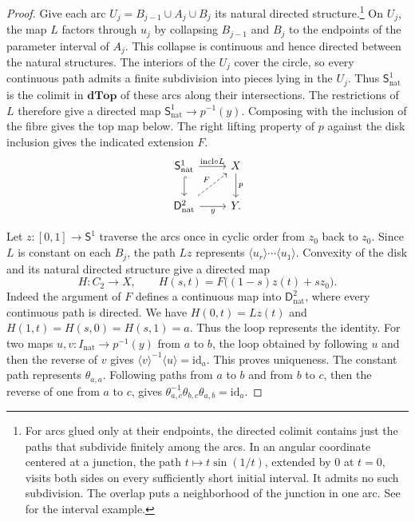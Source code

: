 \documentclass[12pt,a4paper]{amsart}
\theoremstyle{definition}
\newcommand{\D}{\mathbf{dTop}}
\newcommand{\rev}[1]{#1_{\mathrm{nat}}}
\newcommand{\Iv}{\rev{I}}
\newcommand{\cube}[1]{C_{#1}}
\newcommand{\clp}[1]{\langle #1\rangle}
\begin{document}
\begin{proof}
Give each arc $U_j=B_{j-1}\cup A_j\cup B_j$ its natural directed structure.\footnote{For arcs glued only at their endpoints, the directed colimit contains just the paths that subdivide finitely among the arcs. In an angular coordinate centered at a junction, the path $t\mapsto t\sin(1/t)$, extended by $0$ at $t=0$, visits both sides on every sufficiently short initial interval. It admits no such subdivision. The overlap puts a neighborhood of the junction in one arc. See~\cite[Section~1.5, pp.~289--290]{mg} for the interval example.} On $U_j$, the map $L$ factors through $u_j$ by collapsing $B_{j-1}$ and $B_j$ to the endpoints of the parameter interval of $A_j$. This collapse is continuous and hence directed between the natural structures. The interiors of the $U_j$ cover the circle, so every continuous path admits a finite subdivision into pieces lying in the $U_j$. Thus $\rev{\mathsf{S}^1}$ is the colimit in $\D$ of these arcs along their intersections. The restrictions of $L$ therefore give a directed map $\rev{\mathsf{S}^1}\to p^{-1}(y)$. Composing with the inclusion of the fibre gives the top map below. The right lifting property of $p$ against the disk inclusion gives the indicated extension $F$.
\[
\begin{tikzcd}
 \rev{\mathsf{S}^1}\ar[r,"{\mathrm{incl}\circ L}"]\ar[d,hook]&X\ar[d,"p"]\\
 \rev{\mathsf{D}^2}\ar[r,"y"']\ar[ur,dashed,"F"]&Y .
\end{tikzcd}
\]

Let $z\colon[0,1]\to\mathsf{S}^1$ traverse the arcs once in cyclic order from $z_0$ back to $z_0$. Since $L$ is constant on each $B_j$, the path $Lz$ represents $\clp{u_r}\cdots\clp{u_1}$. Convexity of the disk and its natural directed structure give a directed map
\[
 H\colon\cube2\longrightarrow X,\qquad H(s,t)=F\bigl((1-s)z(t)+s z_0\bigr).
\]
Indeed the argument of $F$ defines a continuous map into $\rev{\mathsf{D}^2}$, where every continuous path is directed. We have $H(0,t)=Lz(t)$ and $H(1,t)=H(s,0)=H(s,1)=a$. Thus the loop represents the identity. For two maps $u,v\colon\Iv\to p^{-1}(y)$ from $a$ to $b$, the loop obtained by following $u$ and then the reverse of $v$ gives $\clp v^{-1}\clp u=\mathrm{id}_a$. This proves uniqueness. The constant path represents $\theta_{a,a}$. Following paths from $a$ to $b$ and from $b$ to $c$, then the reverse of one from $a$ to $c$, gives $\theta_{a,c}^{-1}\theta_{b,c}\theta_{a,b}=\mathrm{id}_a$.
\end{proof}
\end{document}
